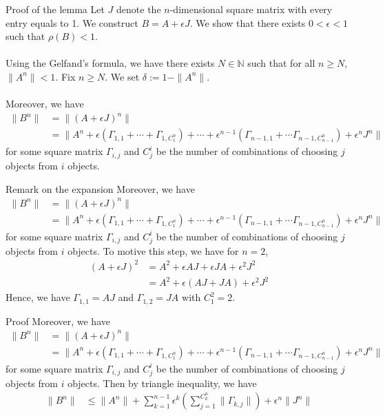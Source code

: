 \documentclass[aspectratio=169]{beamer} %
\begin{document}
\begin{frame}{Proof of the lemma}
Let $J$ denote the $n$-dimensional square matrix with every entry equals to 1. We construct $B = A +\epsilon  J$. We show that there exists $0<\epsilon<1$ such that $\rho(B)<1$.\\
    \\
    Using the Gelfand's formula, we have there exists $N\in\mathbb{N}$ such that for all $n\ge N$, $\|A^n\|< 1$. Fix $n\ge N$. We set $\delta:= 1-\|A^n\|$.\\
    \\
    Moreover, we have 
    \begin{align*}
        \|B^n\| &= \|(A+\epsilon J)^n\|\\
        &= \|A^n +  \epsilon (\Gamma_{1,1} +\cdots + \Gamma_{1,C^n_1})+\cdots +  \epsilon^{n-1}(\Gamma_{n-1, 1} + \cdots \Gamma_{n-1, C^{n}_{n-1}}) +\epsilon^n J^n\|
    \end{align*}
    for some square matrix $\Gamma_{i,j}$ and $C^i_j$ be the number of combinations of choosing $j$ objects from $i$ objects.
    
\end{frame}
\begin{frame}{Remark on the expansion}
Moreover, we have 
    \begin{align*}
        \|B^n\| &= \|(A+\epsilon J)^n\|\\
        &= \|A^n +  \epsilon (\Gamma_{1,1} +\cdots + \Gamma_{1,C^n_1})+\cdots +  \epsilon^{n-1}(\Gamma_{n-1, 1} + \cdots \Gamma_{n-1, C^{n}_{n-1}}) +\epsilon^n J^n\|
    \end{align*}
    for some square matrix $\Gamma_{i,j}$ and $C^i_j$ be the number of combinations of choosing $j$ objects from $i$ objects.
To motive this step, we have for $n=2$,
    \begin{align*}
        (A + \epsilon J)^2  &= A^2 + \epsilon AJ + \epsilon J A + \epsilon^2 J^2\\
        &= A^2 + \epsilon (AJ +JA) +\epsilon ^2 J^2
    \end{align*}
    Hence, we have $\Gamma_{1,1} = AJ$ and $\Gamma_{1,2} = JA$ with $C^2_1 =2$.
\end{frame}
\begin{frame}{Proof}
Moreover, we have 
    \begin{align*}
        \|B^n\| &= \|(A+\epsilon J)^n\|\\
        &= \|A^n +  \epsilon (\Gamma_{1,1} +\cdots + \Gamma_{1,C^n_1})+\cdots +  \epsilon^{n-1}(\Gamma_{n-1, 1} + \cdots \Gamma_{n-1, C^{n}_{n-1}}) +\epsilon^n J^n\|
    \end{align*}
    for some square matrix $\Gamma_{i,j}$ and $C^i_j$ be the number of combinations of choosing $j$ objects from $i$ objects.
\noindent Then by triangle inequality, we have
    \begin{align*}
         \|B^n\| &\le \|A^n\| + \sum_{k=1}^{n-1} \epsilon^k \left(\sum_{j=1}^{C^n_k} \|\Gamma_{k,j}\|\right) + \epsilon^n \|J^n\|
    \end{align*}
    
\end{frame}
\end{document}
